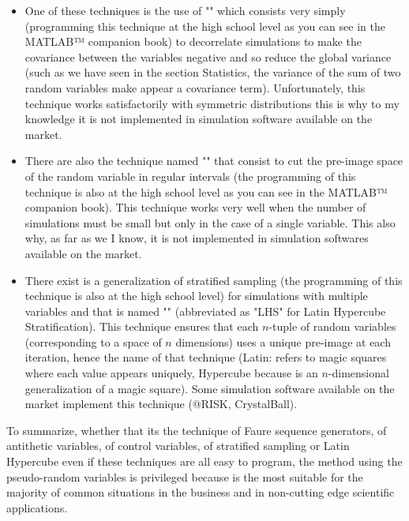 	\begin{itemize}
		\item One of these techniques is the use of "" which consists very simply (programming this technique at the high school level as you can see in the MATLAB™ companion book) to decorrelate simulations to make the covariance between the variables negative  and so reduce the global variance (such as we have seen in the section Statistics, the variance of the sum of two random variables make appear a covariance term). Unfortunately, this technique works satisfactorily with symmetric distributions this is why to my knowledge it is not implemented in simulation software available on the market.

		\item There are also the technique named "" that consist to cut the  pre-image space of the random variable in regular intervals (the programming of this technique is also at the high school level as you can see in the MATLAB™ companion book). This technique works very well when the number of simulations must be small but only in the case of a single variable. This also why, as far as we I know, it is not implemented in simulation softwares available on the market.

		\item There exist is a generalization of stratified sampling (the programming of this technique is also at the high school level) for simulations with multiple variables and that is named "" (abbreviated as "LHS" for Latin Hypercube Stratification). This technique ensures that each $n$-tuple of random variables (corresponding to a space of $n$ dimensions) uses a unique pre-image at each iteration, hence the name of that technique (Latin: refers to magic squares where each value appears uniquely, Hypercube because is an $n$-dimensional generalization of a magic square). Some simulation software available on the market implement this technique (@RISK, CrystalBall).
	\end{itemize}
	To summarize, whether that its the technique of Faure sequence generators, of antithetic variables, of control variables, of stratified sampling or Latin Hypercube even if these techniques are all easy to program, the method using the pseudo-random variables is privileged because is the most suitable for the majority of common situations in the business and in non-cutting edge scientific applications.
	
